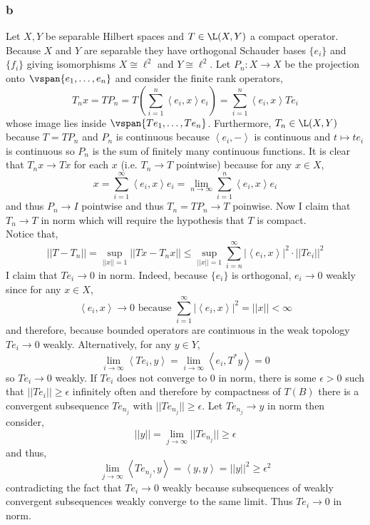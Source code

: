 \documentclass[12pt]{article}
\newcommand{\inner}[2]{\left< #1, #2 \right>}
\begin{document}
\subsubsection{b}

Let $X, Y$ be separable Hilbert spaces and $T \in \L(X, Y)$ a compact operator. Because $X$ and $Y$ are separable they have orthogonal Schauder bases $\{ e_i \}$ and $\{ f_i \}$ giving isomorphisms $X \cong \ell^2$ and $Y \cong \ell^2$. Let $P_n : X \to X$ be the projection onto $\vspan{e_1, \dots, e_n}$ and consider the finite rank operators,
\[ T_n x = T P_n = T \left( \sum_{i = 1}^n \inner{e_i}{x} e_i \right) = \sum_{i = 1}^n \inner{e_i}{x} T e_i \]
whose image lies inside $\vspan{T e_1, \dots, T e_n}$.  Furthermore, $T_n \in \L(X, Y)$ because $T = T P_n$ and $P_n$ is continuous because $\inner{e_i}{-}$ is continuous and $t \mapsto t e_i$ is continuous so $P_n$ is the sum of finitely many continuous functions. It is clear that $T_n x \to T x$ for each $x$ (i.e. $T_n \to T$ pointwise) because for any $x \in X$,
\[ x = \sum_{i = 1}^\infty \inner{e_i}{x} e_i = \lim_{n \to \infty} \sum_{i = 1}^n \inner{e_i}{x} e_i \]
and thus $P_n \to I$ pointwise and thus $T_n = T P_n \to T$ poinwise. Now I claim that $T_n \to T$ in norm which will require the hypothesis that $T$ is compact.
\bigskip\\
Notice that,
\[ || T - T_n || = \sup_{|| x || = 1} || T x - T_n x || \le \sup_{|| x || = 1} \sum_{i = n}^\infty | \inner{e_i}{x} |^2 \cdot || T e_i ||^2 \]
I claim that $T e_i \to 0$ in norm. Indeed, because $\{ e_i \}$ is orthogonal, $e_i \to 0$ weakly since for any $x \in X$,
\[ \inner{e_i}{x} \to 0 \text{ because } \sum_{i = 1}^\infty | \inner{e_i}{x} |^2 = || x || < \infty \]
and therefore, because bounded operators are continuous in the weak topology $T e_i \to 0$ weakly. Alternatively, for any $y \in Y$,
\[ \lim_{i \to \infty} \inner{T e_i}{y} = \lim_{i \to \infty} \inner{e_i}{T^* y} = 0 \]
so $T e_i \to 0$ weakly. If $T e_i$ does not converge to $0$ in norm, there is some $\epsilon > 0$ such that $|| T e_i || \ge \epsilon$ infinitely often and therefore by compactness of $T(B)$ there is a convergent subsequence $T e_{n_j}$ with $|| T e_{n_j} || \ge \epsilon$. Let $T e_{n_j} \to y$ in norm then consider,
\[ || y || = \lim_{j \to \infty} || T e_{n_j} || \ge \epsilon \]
and thus,
\[ \lim_{j \to \infty} \inner{T e_{n_j}}{y} = \inner{y}{y} = || y ||^2 \ge \epsilon^2 \]
contradicting the fact that $T e_{i} \to 0$ weakly because subsequences of weakly convergent subsequences weakly converge to the same limit. Thus $T e_i \to 0$ in norm. 
\end{document}

